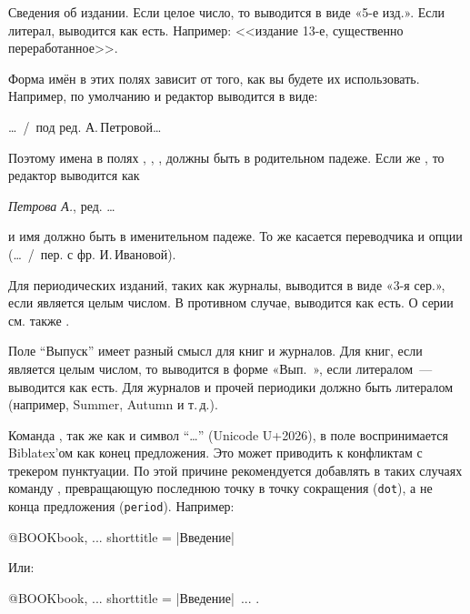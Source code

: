\documentclass[10pt,a4paper,headings=small,numbers=enddot,english,russian]{ltxdockit}[2011/03/25]
\newcommand*{\biblatex}{Biblatex\xspace}
\newenvironment{bibexample}{\begin{list}
     {}
     {\setlength{\leftmargin}{\parindent}%
      \setlength{\itemindent}{-\leftmargin}%
      \setlength{\parsep}{0pt}}}
  {\end{list}}
\begin{document}
\begin{fieldlist}

Сведения об издании. Если целое число, то выводится в виде «5-е изд.». Если литерал, выводится как есть. Например: <<издание 13-е, существенно переработанное>>.


Форма имён в этих полях зависит от того, как вы будете их использовать.
Например, по умолчанию   и редактор выводится в виде:

\begin{bibexample}
\item \ldots\ \slash\ под ред. А.\,Петровой\ldots
\end{bibexample}

Поэтому имена в полях , , ,
 должны быть в родительном падеже. Если же ,
то редактор выводится как

\begin{bibexample}
\item \textit{Петрова А.}, ред. \ldots
\end{bibexample}

и имя должно быть в именительном падеже. То же касается переводчика и опции 
(\ldots~/~пер. с фр.  И.\,Ивановой).


Для периодических изданий, таких как журналы, выводится в виде «3-я сер.», если
является целым числом. В противном случае, выводится как есть.
О серии см. также .


Поле \enquote{Выпуск} имеет разный смысл для книг и журналов. Для книг, если является
целым числом, то выводится в форме «Вып.~», если литералом~--- выводится как есть.
Для журналов и прочей периодики должно быть литералом (например, Summer, Autumn и т.\,д.).

\label{ellipsis}

Команда , так же как и символ \enquote{…} (Unicode U+2026), в поле  воспринимается \biblatex'ом
как конец предложения. Это может приводить к конфликтам с трекером пунктуации.
По этой причине рекомендуется добавлять в таких случаях
команду , превращающую
последнюю точку в точку сокращения (\texttt{dot}), а не конца предложения
(\texttt{period}). Например:

\begin{ltxcode}[escapechar=|]
@BOOK{book,
  ...
  shorttitle = {|Введение|~\textellipsis\isdot}
}
\end{ltxcode}

Или:

\begin{ltxcode}[escapechar=|]
@BOOK{book,
  ...
  shorttitle = {|Введение|~...\isdot}
}.
\end{ltxcode}

\end{fieldlist}
\end{document}
